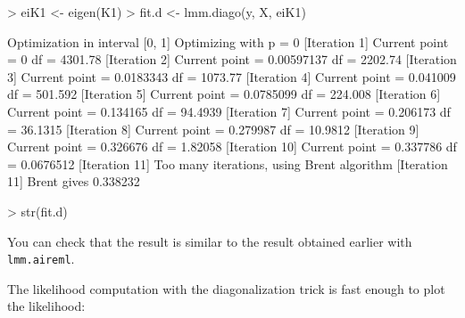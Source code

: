 \documentclass{article}
\renewenvironment{Schunk}{\vspace{\topsep}}{\vspace{\topsep}}
\begin{document}
\begin{Schunk}
\begin{Sinput}
> eiK1 <- eigen(K1)
> fit.d <- lmm.diago(y, X, eiK1)
\end{Sinput}
\begin{Soutput}
Optimization in interval [0, 1]
Optimizing with p = 0
[Iteration 1] Current point = 0 df = 4301.78
[Iteration 2] Current point = 0.00597137 df = 2202.74
[Iteration 3] Current point = 0.0183343 df = 1073.77
[Iteration 4] Current point = 0.041009 df = 501.592
[Iteration 5] Current point = 0.0785099 df = 224.008
[Iteration 6] Current point = 0.134165 df = 94.4939
[Iteration 7] Current point = 0.206173 df = 36.1315
[Iteration 8] Current point = 0.279987 df = 10.9812
[Iteration 9] Current point = 0.326676 df = 1.82058
[Iteration 10] Current point = 0.337786 df = 0.0676512
[Iteration 11] Too many iterations, using Brent algorithm
[Iteration 11] Brent gives 0.338232
\end{Soutput}
\begin{Sinput}
> str(fit.d)
\end{Sinput}
\end{Schunk}
  You can check that the result is similar to the result obtained earlier with 
  \verb!lmm.aireml!.

  The likelihood computation with the diagonalization trick is fast enough to 
  plot the likelihood:
\end{document}

